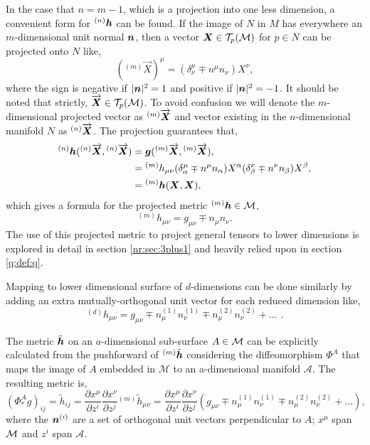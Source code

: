 In the case that $n=m-1$, which is a projection into one less dimension, a convenient form for ${}^{(n)}\boldsymbol{h}$ can be found. If the image of $N$ in $M$ has everywhere an $m$-dimensional unit normal $\boldsymbol{n}$, then a vector $\boldsymbol{X}\in \mathcal{T}_p(\mathcal{M})$ for $p\in N$ can be projected onto $N$ like,
\begin{equation}
({}^{(m)}\overrightarrow{{X}})^\mu = (\delta^\mu_\nu \mp n^\mu n_\nu )X^\nu,
\end{equation}
where the sign is negative if $|\boldsymbol{n}|^2=1$ and positive if $|\boldsymbol{n}|^2 = -1$. It should be noted that strictly, $\overrightarrow{\boldsymbol{X}} \in \mathcal{T}_p(\mathcal{M})$. To avoid confusion we will denote the $m$-dimensional projected vector as ${}^{(m)}\overrightarrow{\boldsymbol{X}}$ and vector existing in the $n$-dimensional manifold $N$ as ${}^{(n)}\overrightarrow{\boldsymbol{X}}$. The projection guarantees that,
\begin{align}
{}^{(n)}\boldsymbol{h} ({}^{(n)}\overrightarrow{\boldsymbol{X}},{}^{(n)}\overrightarrow{\boldsymbol{X}}  ) &= \boldsymbol{g} ({}^{(m)}\overrightarrow{\boldsymbol{X}},{}^{(m)}\overrightarrow{\boldsymbol{X}}  ),\\
&= {}^{(m)}{h}_{\mu\nu} (\delta^\mu_\alpha \mp n^\mu n_\alpha) {{X}}^\alpha(\delta^\nu_\beta \mp n^\nu n_\beta) {{X}}^\beta  ,\\
&= {}^{(m)}\boldsymbol{h} ({\boldsymbol{X}},{\boldsymbol{X}}  ),
\end{align}
which gives a formula for the projected metric ${}^{(m)}\boldsymbol{h} \in \mathcal{M}$,
\begin{equation}
{}^{(m)}h_{\mu\nu} = g_{\mu\nu} \mp n_\mu n_\nu.
\end{equation}
The use of this projected metric to project general tensors to lower dimensions is explored in detail in section \ref{nr:sec:3plus1} and heavily relied upon in section \ref{q:def:q}.

Mapping to lower dimensional surface of $d$-dimensions can be done similarly by adding an extra mutually-orthogonal unit vector for each reduced dimension like,
\begin{equation}
{}^{(d)}h_{\mu\nu} = g_{\mu\nu} \mp n^{(1)}_\mu n^{(1)}_\nu  \mp n^{(2)}_\mu n^{(2)}_\nu + ... \,\,.
\end{equation}

The metric $\tilde{\boldsymbol{h}}$ on an $a$-dimensional sub-surface $A\in\mathcal{M}$ can be explicitly calculated from the pushforward of ${}^{(m)}\tilde{\boldsymbol{h}}$ considering the diffeomorphism $\Phi^A$ that maps the image of $A$ embedded in $\mathcal{M}$ to an a-dimensional manifold $\mathcal{A}$. The resulting metric is, 
\begin{equation}
(\Phi^A_* g)_{ij} = \tilde{h}_{ij} = \frac{\partial x^\mu}{\partial z^i} \frac{\partial x^\nu}{\partial z^j} {}^{(m)}\tilde{h}_{\mu\nu}  = \frac{\partial x^\mu}{\partial z^i} \frac{\partial x^\nu}{\partial z^j}\left( g_{\mu\nu}\mp n^{(1)}_\mu n^{(1)}_\nu  \mp n^{(2)}_\mu n^{(2)}_\nu + ...  \right), \label{intro:eq:projectedmetric}
\end{equation}
where the $\boldsymbol{n}^{(i)}$ are a set of orthogonal unit vectors perpendicular to $A$; $x^\mu$ span $\mathcal{M}$ and $z^i$ span $\mathcal{A}$.



